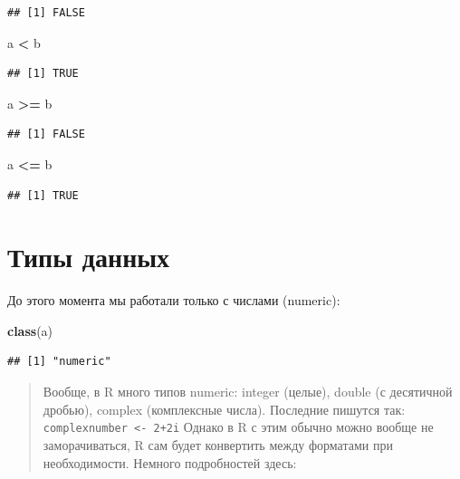 \documentclass[]{book}
\newenvironment{Shaded}{\begin{snugshade}}{\end{snugshade}}
\newcommand{\KeywordTok}[1]{\textcolor[rgb]{0.13,0.29,0.53}{\textbf{#1}}}
\newcommand{\StringTok}[1]{\textcolor[rgb]{0.31,0.60,0.02}{#1}}
\newcommand{\OperatorTok}[1]{\textcolor[rgb]{0.81,0.36,0.00}{\textbf{#1}}}
\newcommand{\NormalTok}[1]{#1}
\begin{document}
\begin{verbatim}
## [1] FALSE
\end{verbatim}

\begin{Shaded}
\begin{Highlighting}[]
\NormalTok{a }\OperatorTok{<}\StringTok{ }\NormalTok{b}
\end{Highlighting}
\end{Shaded}

\begin{verbatim}
## [1] TRUE
\end{verbatim}

\begin{Shaded}
\begin{Highlighting}[]
\NormalTok{a }\OperatorTok{>=}\StringTok{ }\NormalTok{b}
\end{Highlighting}
\end{Shaded}

\begin{verbatim}
## [1] FALSE
\end{verbatim}

\begin{Shaded}
\begin{Highlighting}[]
\NormalTok{a }\OperatorTok{<=}\StringTok{ }\NormalTok{b}
\end{Highlighting}
\end{Shaded}

\begin{verbatim}
## [1] TRUE
\end{verbatim}

\section{Типы данных}\label{data_types}

До этого момента мы работали только с числами (numeric):

\begin{Shaded}
\begin{Highlighting}[]
\KeywordTok{class}\NormalTok{(a)}
\end{Highlighting}
\end{Shaded}

\begin{verbatim}
## [1] "numeric"
\end{verbatim}

\begin{quote}
Вообще, в R много типов numeric: integer (целые), double (с десятичной
дробью), complex (комплексные числа). Последние пишутся так:
\texttt{complexnumber\ \textless{}-\ 2+2i} Однако в R с этим обычно
можно вообще не заморачиваться, R сам будет конвертить между форматами
при необходимости. Немного подробностей здесь:
\end{quote}
\end{document}
